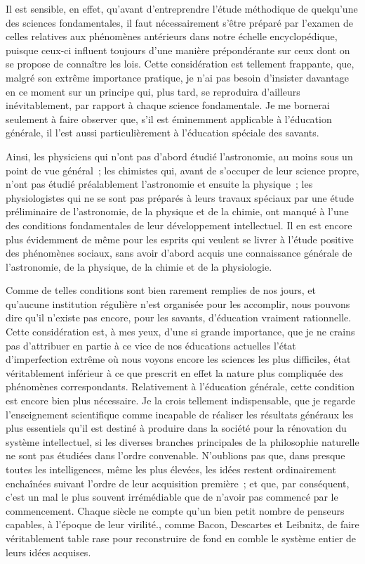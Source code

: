 \documentclass[french,twoside]{book} %
\begin{document}
Il est sensible, en effet, qu’avant d’entreprendre l’étude méthodique de quelqu’une des sciences fondamentales, il faut nécessairement s’être préparé par l’examen de celles relatives aux phénomènes antérieurs dans notre échelle encyclopédique, puisque ceux-ci influent toujours d’une manière prépondérante sur ceux dont on se propose de connaître les lois. Cette considération est tellement frappante, que, malgré son extrême importance pratique, je n’ai pas besoin d’insister davantage en ce moment sur un principe qui, plus tard, se reproduira d’ailleurs inévitablement, par rapport à chaque science fondamentale. Je me bornerai seulement à faire observer que, s’il est éminemment applicable à l’éducation générale, il l’est aussi particulièrement à l’éducation spéciale des savants.\par
Ainsi, les physiciens qui n’ont pas d’abord étudié l’astronomie, au moins sous un point de vue général ; les chimistes qui, avant de s’occuper de leur science propre, n’ont pas étudié préalablement l’astronomie et ensuite la physique ; les physiologistes qui ne se sont pas préparés à leurs travaux spéciaux par une étude préliminaire de l’astronomie, de la physique et de la chimie, ont manqué à l’une des conditions fondamentales de leur développement intellectuel. Il en est encore plus évidemment de même pour les esprits qui veulent se livrer à l’étude positive des phénomènes sociaux, sans avoir d’abord acquis une connaissance générale de l’astronomie, de la physique, de la chimie et de la physiologie.\par
Comme de telles conditions sont bien rarement remplies de nos jours, et qu’aucune institution régulière n’est organisée pour les accomplir, nous pouvons dire qu’il n’existe pas encore, pour les savants, d’éducation vraiment rationnelle. Cette considération est, à mes yeux, d’une si grande importance, que je ne crains pas d’attribuer en partie à ce vice de nos éducations actuelles l’état d’imperfection extrême où nous voyons encore les sciences les plus difficiles, état véritablement inférieur à ce que prescrit en effet la nature plus compliquée des phénomènes correspondants. Relativement à l’éducation générale, cette condition est encore bien plus nécessaire. Je la crois tellement indispensable, que je regarde l’enseignement scientifique comme incapable de réaliser les résultats généraux les plus essentiels qu’il est destiné à produire dans la société pour la rénovation du système intellectuel, si les diverses branches principales de la philosophie naturelle ne sont pas étudiées dans l’ordre convenable. N’oublions pas que, dans presque toutes les intelligences, même les plus élevées, les idées restent ordinairement enchaînées suivant l’ordre de leur acquisition première ; et que, par conséquent, c’est un mal le plus souvent irrémédiable que de n’avoir pas commencé par le commencement. Chaque siècle ne compte qu’un bien petit nombre de penseurs capables, à l’époque de leur virilité., comme Bacon, Descartes et Leibnitz, de faire véritablement table rase pour reconstruire de fond en comble le système entier de leurs idées acquises.\par
\end{document}

